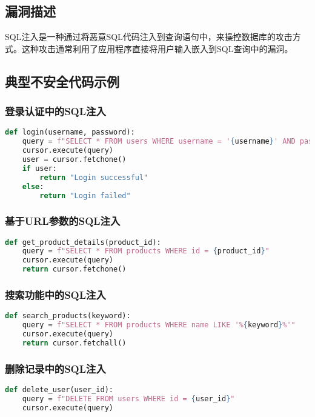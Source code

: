 \documentclass{article}
\begin{document}
\subsection{漏洞描述}
SQL注入是一种通过将恶意SQL代码注入到查询语句中，来操控数据库的攻击方式。这种攻击通常利用了应用程序直接将用户输入嵌入到SQL查询中的漏洞。

\subsection{典型不安全代码示例}

\subsubsection{登录认证中的SQL注入}
\begin{lstlisting}[language=Python, caption=存在SQL注入漏洞的登录代码]
def login(username, password):
    query = f"SELECT * FROM users WHERE username = '{username}' AND password = '{password}'"
    cursor.execute(query)
    user = cursor.fetchone()
    if user:
        return "Login successful"
    else:
        return "Login failed"
\end{lstlisting}

\subsubsection{基于URL参数的SQL注入}
\begin{lstlisting}[language=Python, caption=URL参数导致的SQL注入]
def get_product_details(product_id):
    query = f"SELECT * FROM products WHERE id = {product_id}"
    cursor.execute(query)
    return cursor.fetchone()
\end{lstlisting}

\subsubsection{搜索功能中的SQL注入}
\begin{lstlisting}[language=Python, caption=搜索功能中的SQL注入]
def search_products(keyword):
    query = f"SELECT * FROM products WHERE name LIKE '%{keyword}%'"
    cursor.execute(query)
    return cursor.fetchall()
\end{lstlisting}

\subsubsection{删除记录中的SQL注入}
\begin{lstlisting}[language=Python, caption=删除记录中的SQL注入]
def delete_user(user_id):
    query = f"DELETE FROM users WHERE id = {user_id}"
    cursor.execute(query)
\end{lstlisting}
\end{document}
